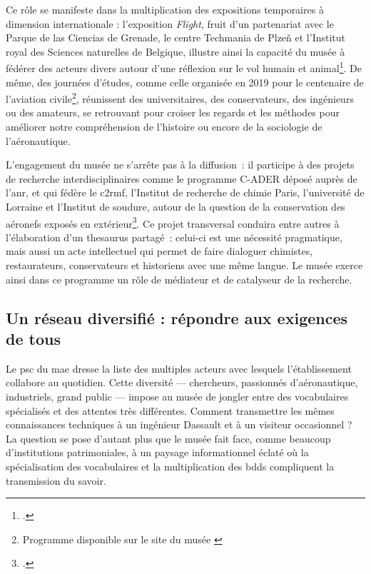 Ce rôle se manifeste dans la multiplication des expositions temporaires à dimension internationale : l’exposition \emph{Flight}, fruit d’un partenariat avec le Parque de las Ciencias de Grenade, le centre Techmania de Plzeň et l’Institut royal des Sciences naturelles de Belgique, illustre ainsi la capacité du musée à fédérer des acteurs divers autour d’une réflexion sur le vol humain et animal\footcite{ExpositionFlight2024}. De même, des journées d’études, comme celle organisée en 2019 pour le centenaire de l’aviation civile\footnote{Programme disponible sur le site du musée \cite{19192019CentAns}}, réunissent des universitaires, des conservateurs, des ingénieurs ou des amateurs, se retrouvant pour croiser les regards et les méthodes pour améliorer notre compréhension de l'histoire ou encore de la sociologie de l'aéronautique.

L’engagement du musée ne s’arrête pas à la diffusion : il participe à des projets de recherche interdisciplinaires comme le programme C-ADER déposé auprès de l'\ac{anr}, et qui fédère le \ac{c2rmf}, l’Institut de recherche de chimie Paris, l’université de Lorraine et l’Institut de soudure, autour de la  question de la conservation des aéronefs exposés en extérieur\footcite{CADERConservationDanciens}. Ce projet transversal conduira entre autres à l’élaboration d’un \gls{thesaurus} partagé : celui-ci est une nécessité pragmatique, mais aussi un acte intellectuel qui permet de faire dialoguer chimistes, restaurateurs, conservateurs et historiens avec une même langue. Le musée exerce ainsi dans ce programme un rôle de médiateur et de catalyseur de la recherche.

\subsection{Un réseau diversifié : répondre aux exigences de tous}

Le \ac{psc} du \ac{mae} dresse la liste des multiples acteurs avec lesquels l'établissement collabore au quotidien. Cette diversité — chercheurs, passionnés d'aéronautique, industriels, grand public — impose au musée de jongler entre des vocabulaires spécialisés et des attentes très différentes. Comment transmettre les mêmes connaissances techniques à un ingénieur Dassault et à un visiteur occasionnel ? La question se pose d'autant plus que le musée fait face, comme beaucoup d'institutions patrimoniales, à un paysage informationnel éclaté où la spécialisation des vocabulaires et la multiplication des \glspl{bdd} compliquent la transmission du savoir.

